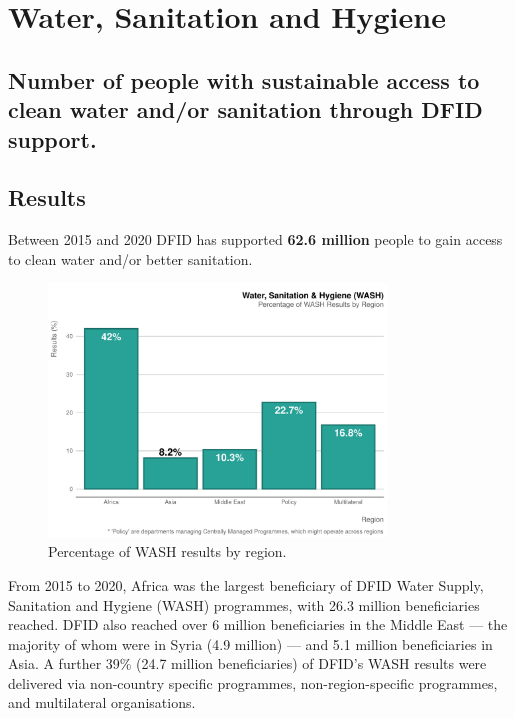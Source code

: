 \chapter{Water, Sanitation and Hygiene}

\section*{Number of people with sustainable access to clean water and/or sanitation through DFID support.}
\thispagestyle{empty}

\section{Results}

Between 2015 and 2020 DFID has supported \textbf{62.6 million} people to gain access to clean water and/or better sanitation. %

\begin{figure}[htbp]
	\centering
	\includegraphics[width=0.8\textwidth]{../figs/wash_region_plot} \hfill
	\caption{Percentage of WASH results by region.}
	\label{fig:wash_region_plot}
\end{figure}


From 2015 to 2020, Africa was the largest beneficiary of DFID Water Supply, Sanitation and Hygiene (WASH) programmes, with 26.3 million beneficiaries reached. %
DFID also reached over 6 million beneficiaries in the Middle East --- the majority of whom were in Syria (4.9 million) --- and 5.1 million beneficiaries in Asia. %
A further 39\% (24.7 million beneficiaries) of DFID's WASH results were delivered via non-country specific programmes, non-region-specific programmes, and multilateral organisations. %

